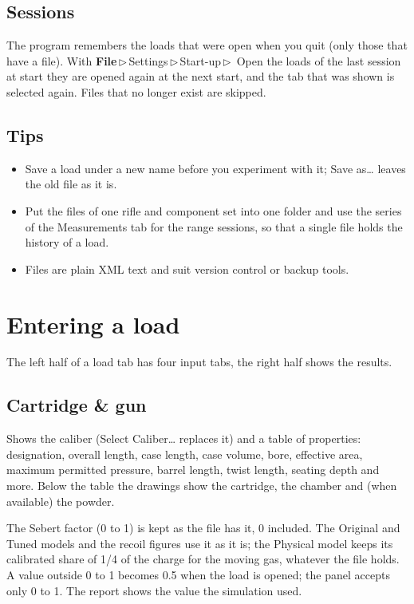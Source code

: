 \documentclass[11pt,a4paper]{article}
\newcommand{\ui}[1]{\textsf{#1}}
\newcommand{\menu}[1]{\textsf{\textbf{#1}}}
\newcommand{\sep}{\,$\triangleright$\,}
\begin{document}
\subsection{Sessions}
The program remembers the loads that were open when you quit (only those that have a file). With \menu{File}\sep\ui{Settings}\sep\ui{Start-up}\sep
\ui{Open the loads of the last session at start} they are opened again at the next start, and the tab that was shown is selected again. Files that no longer
exist are skipped.

\subsection{Tips}
\begin{itemize}
  \item Save a load under a new name before you experiment with it; \ui{Save as\dots} leaves the old file as it is.
  \item Put the files of one rifle and component set into one folder and use the series of the \ui{Measurements} tab for the range sessions, so that a
        single file holds the history of a load.
  \item Files are plain XML text and suit version control or backup tools.
\end{itemize}

\section{Entering a load}

The left half of a load tab has four input tabs, the right half shows the results.

\subsection{Cartridge \& gun}
Shows the caliber (\ui{Select Caliber\dots} replaces it) and a table of properties: designation, overall length, case length, case volume,
bore, effective area, maximum permitted pressure, barrel length, twist length, seating depth and more. Below the table the
drawings show the cartridge, the chamber and (when available) the powder.

The Sebert factor (0 to 1) is kept as the file has it, 0 included. The Original and Tuned models and the recoil figures use it as it is; the Physical model keeps its calibrated share of 1/4 of the charge for the moving gas, whatever the file holds. A value outside 0 to 1 becomes 0.5 when the load is opened; the panel accepts only 0 to 1. The report shows the value the simulation used.
\end{document}
